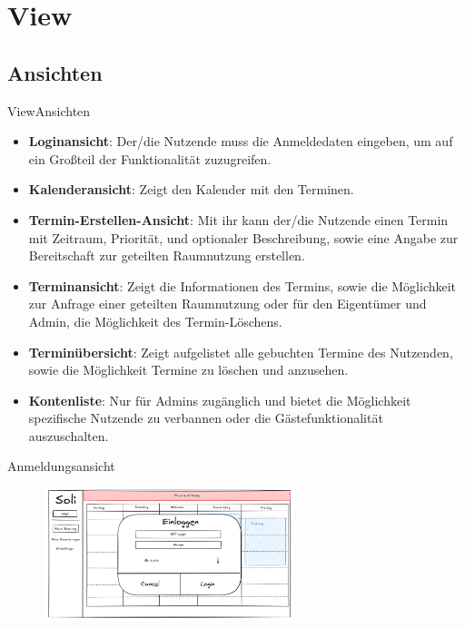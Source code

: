 \documentclass{sdqbeamer}
\begin{document}
\section{View}

\subsection{Ansichten}

\begin{frame}{View}{Ansichten}
    \begin{itemize}
        \item \textbf{Loginansicht}: Der/die Nutzende muss die Anmeldedaten eingeben, um auf ein Großteil der Funktionalität zuzugreifen.
        \item \textbf{Kalenderansicht}: Zeigt den Kalender mit den Terminen.
        \item \textbf{Termin-Erstellen-Ansicht}: Mit ihr kann der/die Nutzende einen Termin mit Zeitraum, Priorität, und optionaler Beschreibung, sowie eine Angabe zur Bereitschaft zur geteilten Raumnutzung erstellen.
        \item \textbf{Terminansicht}: Zeigt die Informationen des Termins, sowie die Möglichkeit zur Anfrage einer geteilten Raumnutzung oder für den Eigentümer und Admin, die Möglichkeit des Termin-Löschens.
        \item \textbf{Terminübersicht}: Zeigt aufgelistet alle gebuchten Termine des Nutzenden, sowie die Möglichkeit Termine zu löschen und anzusehen.
        \item \textbf{Kontenliste}: Nur für Admins zugänglich und bietet die Möglichkeit spezifische Nutzende zu verbannen oder die Gästefunktionalität auszuschalten.
    \end{itemize}
\end{frame}

\begin{frame}{Anmeldungsansicht}
    \begin{figure}
        \centering
        \includegraphics[width=0.65\textwidth]{pictures/figures/ui/anmeldungsseite}
        \label{fig:login}
    \end{figure}
\end{frame}
\end{document}
